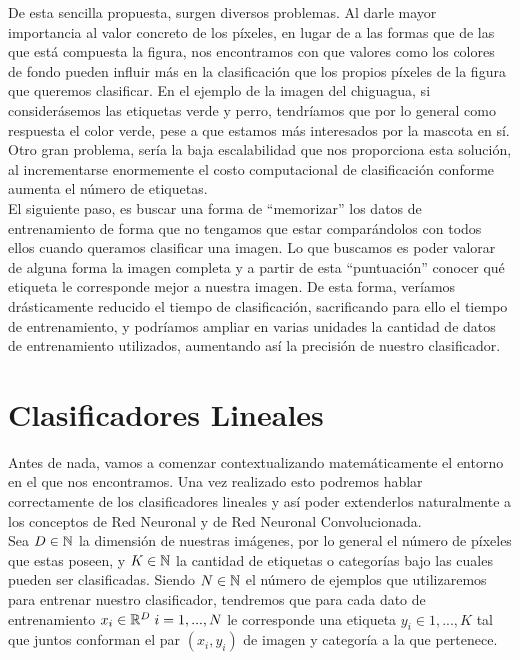 De esta sencilla propuesta, surgen diversos problemas. Al darle mayor importancia al valor concreto de los píxeles, en lugar de a las formas que de las que está compuesta la figura, nos encontramos con que valores como los colores de fondo pueden influir más en la clasificación que los propios píxeles de la figura que queremos clasificar. En el ejemplo de la imagen del chiguagua, si considerásemos las etiquetas verde y perro, tendríamos que por lo general como respuesta el color verde, pese a que estamos más interesados por la mascota en sí. Otro gran problema, sería la baja escalabilidad que nos proporciona esta solución, al incrementarse enormemente el costo computacional de clasificación conforme aumenta el número de etiquetas.\\

El siguiente paso, es buscar una forma de ``memorizar'' los datos de entrenamiento de forma que no tengamos que estar comparándolos con todos ellos cuando queramos clasificar una imagen. Lo que buscamos es poder valorar de alguna forma la imagen completa y a partir de esta ``puntuación'' conocer qué etiqueta le corresponde mejor a nuestra imagen. De esta forma, veríamos drásticamente reducido el tiempo de clasificación, sacrificando para ello el tiempo de entrenamiento, y podríamos ampliar en varias unidades la cantidad de datos de entrenamiento utilizados, aumentando así la precisión de nuestro clasificador.

\section{Clasificadores Lineales}

Antes de nada, vamos a comenzar contextualizando matemáticamente el entorno en el que nos encontramos. Una vez realizado esto podremos hablar correctamente de los clasificadores lineales y así poder extenderlos naturalmente a los conceptos de Red Neuronal y de Red Neuronal Convolucionada.\\

Sea $D \in \mathbb{N}$ la dimensión de nuestras imágenes, por lo general el número de píxeles que estas poseen, y $K \in \mathbb{N}$ la cantidad de etiquetas o categorías bajo las cuales pueden ser clasificadas. Siendo $N \in \mathbb{N}$ el número de ejemplos que utilizaremos para entrenar nuestro clasificador, tendremos que para cada dato de entrenamiento $x_i \in \mathbb{R}^D \; i=1,...,N$ le corresponde una etiqueta $y_i \in 1,...,K$ tal que juntos conforman el par $(x_i,y_i)$ de imagen y categoría a la que pertenece.\\

